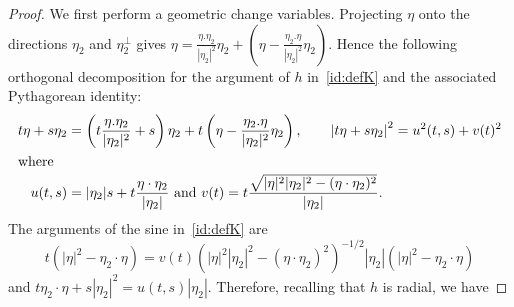 \documentclass[AHL, Unicode, longabstracts,published]{cedram}
\begin{document}
\begin{proof}
We first perform a geometric change variables. Projecting $\eta$ onto the directions $\eta_2$ and $\eta_2^\perp$ gives $\eta=\tfrac{\eta.\eta_2}{|\eta_2|^2}\eta_2+(\eta-\tfrac{\eta_2.\eta}{|\eta_2|^2}\eta_2)$. Hence the following orthogonal decomposition for the argument of $h$ in~\eqref{id:defK} and the associated Pythagorean identity:
\begin{align*}
t\eta + s \eta_2 &=\left(t\frac{\eta.\eta_2}{|\eta_2|^2}+s\right)\eta_2+t\left(\eta-\frac{\eta_2.\eta}{|\eta_2|^2}\eta_2\right), \qquad \left|t\eta + s \eta_2\right|^2= u^2(t,s)+v(t)^2
\\
\intertext{where}
u (t,s) &= |\eta_2|s + t \frac{\eta\cdot \eta_2}{|\eta_2|} \textrm{ and }v(t) = t \frac{\sqrt{|\eta|^2|\eta_2|^2- (\eta\cdot\eta_2)^2}}{|\eta_2|}.
\end{align*}
The arguments of the sine in~\eqref{id:defK} are
\[
t\left(|\eta|^2-\eta_2\cdot \eta\right)=v(t)\left(|\eta|^2|\eta_2|^2- \left(\eta\cdot\eta_2\right)^2\right)^{-1/2}|\eta_2|\left(|\eta|^2-\eta_2\cdot \eta\right)
\]
and $t\eta_2\cdot \eta + s|\eta_2|^2=u(t,s)|\eta_2|$. Therefore, recalling that $h$ is radial, we have


\end{proof}
\end{document}

